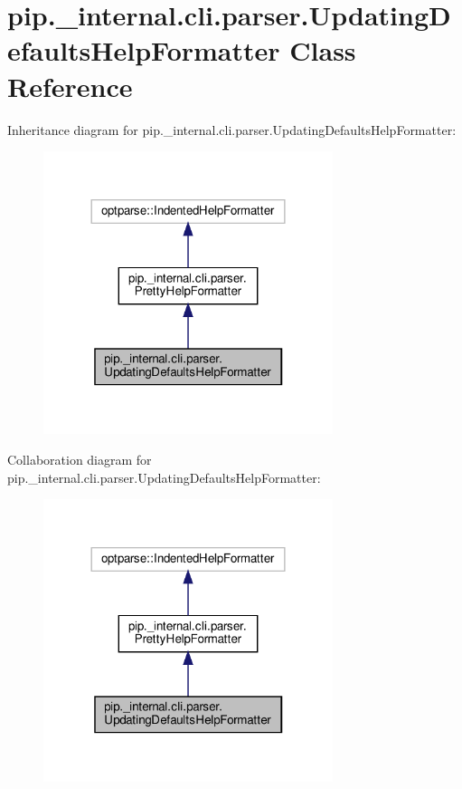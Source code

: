 \hypertarget{classpip_1_1__internal_1_1cli_1_1parser_1_1UpdatingDefaultsHelpFormatter}{}\section{pip.\+\_\+internal.\+cli.\+parser.\+Updating\+Defaults\+Help\+Formatter Class Reference}
\label{classpip_1_1__internal_1_1cli_1_1parser_1_1UpdatingDefaultsHelpFormatter}


Inheritance diagram for pip.\+\_\+internal.\+cli.\+parser.\+Updating\+Defaults\+Help\+Formatter\+:
\nopagebreak
\begin{figure}[H]
\begin{center}
\leavevmode
\includegraphics[width=240pt]{classpip_1_1__internal_1_1cli_1_1parser_1_1UpdatingDefaultsHelpFormatter__inherit__graph}
\end{center}
\end{figure}


Collaboration diagram for pip.\+\_\+internal.\+cli.\+parser.\+Updating\+Defaults\+Help\+Formatter\+:
\nopagebreak
\begin{figure}[H]
\begin{center}
\leavevmode
\includegraphics[width=240pt]{classpip_1_1__internal_1_1cli_1_1parser_1_1UpdatingDefaultsHelpFormatter__coll__graph}
\end{center}
\end{figure}
